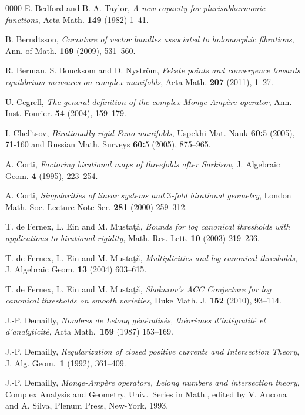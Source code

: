 \documentclass[a4paper,oneside,reqno,11pt]{article}
\begin{document}
\begin{thebibliography}{0000}
 E. Bedford and B. A. Taylor, {\it A new capacity for plurisubharmonic functions}, Acta Math. {\bf 149} (1982) 1--41.

 B. Berndtsson, {\it Curvature of vector bundles associated to holomorphic fibrations}, Ann. of Math. {\bf 169} (2009), 531--560.

 R. Berman, S. Boucksom and D. Nystr\"{o}m, {\it Fekete points and convergence towards equilibrium measures on complex manifolds}, Acta Math. {\bf 207} (2011), 1--27.

 U. Cegrell, {\it The general definition of the complex Monge-Amp\`ere operator}, Ann. Inst. Fourier. {\bf 54} (2004), 159--179.

 I. Chel'tsov, {\it Birationally rigid Fano manifolds}, Uspekhi Mat. Nauk {\bf 60:}5 (2005), 71-160 and Russian Math. Surveys {\bf 60:}5 (2005), 875--965.

 A. Corti, {\it Factoring birational maps of threefolds after Sarkisov}, J. Algebraic Geom. {\bf 4} (1995), 223--254.

 A. Corti, {\it Singularities of linear systems and $3$-fold birational geometry}, London Math. Soc. Lecture Note Ser. { \bf 281} (2000) 259--312.

 T. de Fernex, L. Ein and M. Musta\c{t}\v{a}, {\it Bounds for log canonical thresholds with applications to birational rigidity}, Math. Res. Lett. {\bf 10} (2003) 219--236.

 T. de Fernex, L. Ein and M. Musta\c{t}\v{a}, {\it Multiplicities and log canonical thresholds}, J. Algebraic Geom. {\bf 13} (2004) 603--615.

 T. de Fernex, L. Ein and M. Musta\c{t}\v{a}, {\it Shokurov's ACC Conjecture for log canonical thresholds on smooth varieties}, Duke Math. J. {\bf 152} (2010), 93--114.

 J.-P. Demailly, {\it Nombres de Lelong g\'en\'eralis\'es, th\'eor\`emes d'int\'egralit\'e et d'analyticit\'e}, Acta Math.\ {\bf 159} (1987) 153--169.

 J.-P. Demailly, {\it Regularization of closed positive currents and Intersection Theory}, J. Alg. Geom.\ {\bf 1} (1992), 361--409.

 J.-P. Demailly, {\it Monge-Amp\`ere operators, Lelong numbers and intersection theory}, Complex Analysis and Geometry, Univ.\ Series in Math., edited by V. Ancona and A. Silva, Plenum Press, New-York, 1993.


\end{thebibliography}
\end{document}
